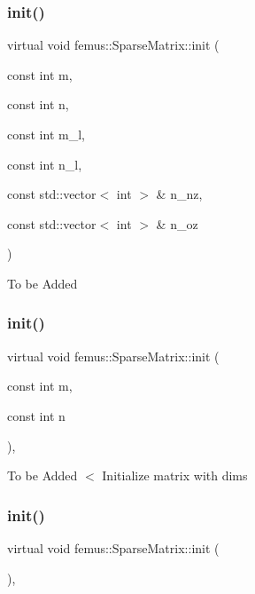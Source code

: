 \subsubsection{\texorpdfstring{init()}{init()}\hspace{0.1cm}{\footnotesize\ttfamily [2/4]}}
{\footnotesize\ttfamily virtual void femus\+::\+Sparse\+Matrix\+::init (\begin{DoxyParamCaption}\item[{const int}]{m,  }\item[{const int}]{n,  }\item[{const int}]{m\+\_\+l,  }\item[{const int}]{n\+\_\+l,  }\item[{const std\+::vector$<$ int $>$ \&}]{n\+\_\+nz,  }\item[{const std\+::vector$<$ int $>$ \&}]{n\+\_\+oz }\end{DoxyParamCaption})\hspace{0.3cm}{\ttfamily [pure virtual]}}

To be Added \mbox{\label{classfemus_1_1_sparse_matrix_aa33ea61eb0f2ccfb81ef3f2a93368ab3}} 
\subsubsection{\texorpdfstring{init()}{init()}\hspace{0.1cm}{\footnotesize\ttfamily [3/4]}}
{\footnotesize\ttfamily virtual void femus\+::\+Sparse\+Matrix\+::init (\begin{DoxyParamCaption}\item[{const int}]{m,  }\item[{const int}]{n }\end{DoxyParamCaption})\hspace{0.3cm}{\ttfamily [inline]}, {\ttfamily [virtual]}}

To be Added $<$ Initialize matrix with dims \mbox{\label{classfemus_1_1_sparse_matrix_adb6027c6f2f5fd54e004ced773b58259}} 
\subsubsection{\texorpdfstring{init()}{init()}\hspace{0.1cm}{\footnotesize\ttfamily [4/4]}}
{\footnotesize\ttfamily virtual void femus\+::\+Sparse\+Matrix\+::init (\begin{DoxyParamCaption}{ }\end{DoxyParamCaption})\hspace{0.3cm}{\ttfamily [inline]}, {\ttfamily [virtual]}}

